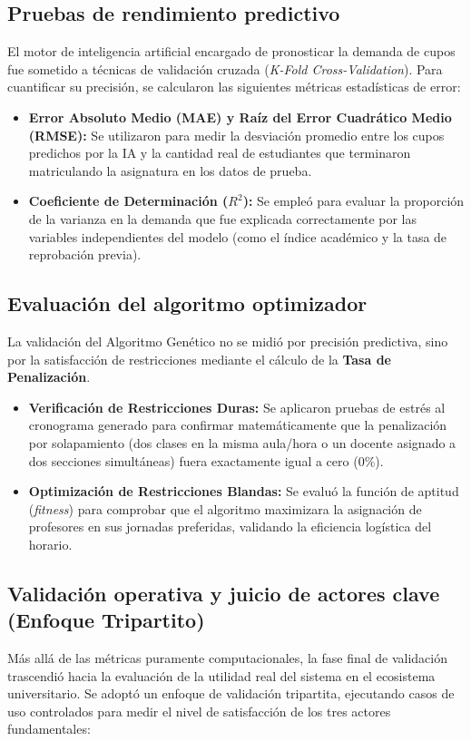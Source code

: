 \subsection{Pruebas de rendimiento predictivo}
El motor de inteligencia artificial encargado de pronosticar la demanda de cupos fue sometido a técnicas de validación cruzada (\textit{K-Fold Cross-Validation}). Para cuantificar su precisión, se calcularon las siguientes métricas estadísticas de error:
\begin{itemize}
    \item \textbf{Error Absoluto Medio (MAE) y Raíz del Error Cuadrático Medio (RMSE):} Se utilizaron para medir la desviación promedio entre los cupos predichos por la IA y la cantidad real de estudiantes que terminaron matriculando la asignatura en los datos de prueba.
    \item \textbf{Coeficiente de Determinación ($R^2$):} Se empleó para evaluar la proporción de la varianza en la demanda que fue explicada correctamente por las variables independientes del modelo (como el índice académico y la tasa de reprobación previa).
\end{itemize}

\subsection{Evaluación del algoritmo optimizador}
La validación del Algoritmo Genético no se midió por precisión predictiva, sino por la satisfacción de restricciones mediante el cálculo de la \textbf{Tasa de Penalización}. 
\begin{itemize}
    \item \textbf{Verificación de Restricciones Duras:} Se aplicaron pruebas de estrés al cronograma generado para confirmar matemáticamente que la penalización por solapamiento (dos clases en la misma aula/hora o un docente asignado a dos secciones simultáneas) fuera exactamente igual a cero ($0\%$).
    \item \textbf{Optimización de Restricciones Blandas:} Se evaluó la función de aptitud (\textit{fitness}) para comprobar que el algoritmo maximizara la asignación de profesores en sus jornadas preferidas, validando la eficiencia logística del horario.
\end{itemize}

\subsection{Validación operativa y juicio de actores clave (Enfoque Tripartito)}
Más allá de las métricas puramente computacionales, la fase final de validación trascendió hacia la evaluación de la utilidad real del sistema en el ecosistema universitario. Se adoptó un enfoque de validación tripartita, ejecutando casos de uso controlados para medir el nivel de satisfacción de los tres actores fundamentales:


